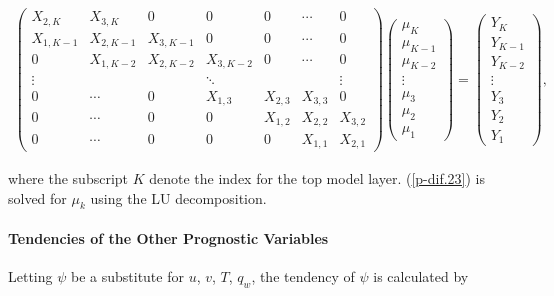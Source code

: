 \begin{eqnarray}
\left(\begin{array}{lllllll}
 X_{2,K}   & X_{3,K}   & 0         & 0         & 0         & \cdots    & 0       \\
 X_{1,K-1} & X_{2,K-1} & X_{3,K-1} & 0         & 0         & \cdots    & 0       \\
 0         & X_{1,K-2} & X_{2,K-2} & X_{3,K-2} & 0         & \cdots    & 0       \\
 \vdots    &           &           & \ddots    &           &           & \vdots  \\
 0         & \cdots    & 0         & X_{1,3}   & X_{2,3}   & X_{3,3}   & 0       \\
 0         & \cdots    & 0         & 0         & X_{1,2}   & X_{2,2}   & X_{3,2} \\
 0         & \cdots    & 0         & 0         & 0         & X_{1,1}   & X_{2,1}
\end{array}\right)
\left(\begin{array}{l}
 \mu_K \\
 \mu_{K-1} \\
 \mu_{K-2} \\
 \vdots \\
 \mu_3 \\
 \mu_2 \\
 \mu_1
\end{array}\right)
= \left(
\begin{array}{l}
 Y_K \\
 Y_{K-1} \\
 Y_{K-2} \\
 \vdots \\
 Y_3 \\
 Y_2 \\
 Y_1
\end{array}
\right), \label{p-dif.23}
\end{eqnarray}

where the subscript \(K\) denote the index for the top model layer.
(\ref{p-dif.23}) is solved for \(\mu_k\) using the LU
decomposition.

\hypertarget{tendencies-of-the-other-prognostic-variables}{%
\paragraph{Tendencies of the Other Prognostic
Variables}\label{tendencies-of-the-other-prognostic-variables}}

Letting \(\psi\) be a substitute for \(u\), \(v\), \(T\), \(q_w\), the
tendency of \(\psi\) is calculated by

